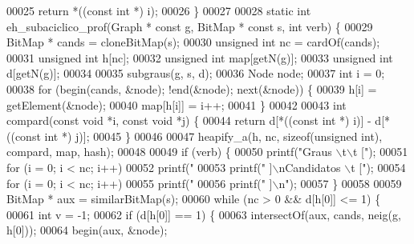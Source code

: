\begin{DoxyCode}
00025         \textcolor{keywordflow}{return} *((\textcolor{keyword}{const} \textcolor{keywordtype}{int} *) i);
00026 \}
00027 
00028 \textcolor{keyword}{static} \textcolor{keywordtype}{int} eh\_subaciclico\_prof(Graph * \textcolor{keyword}{const} g, BitMap * \textcolor{keyword}{const} s, \textcolor{keywordtype}{int} verb) \{
00029         BitMap * cands = cloneBitMap(s);
00030         \textcolor{keywordtype}{unsigned} \textcolor{keywordtype}{int} nc = cardOf(cands);
00031         \textcolor{keywordtype}{unsigned} \textcolor{keywordtype}{int} h[nc];
00032         \textcolor{keywordtype}{unsigned} \textcolor{keywordtype}{int} map[getN(g)];
00033         \textcolor{keywordtype}{unsigned} \textcolor{keywordtype}{int} d[getN(g)];
00034 
00035         subgraus(g, s, d);
00036         Node node;
00037         \textcolor{keywordtype}{int} i = 0;
00038         \textcolor{keywordflow}{for} (begin(cands, &node); !end(&node); next(&node)) \{
00039                 h[i] = getElement(&node);
00040                 map[h[i]] = i++;
00041         \}
00042 
00043         \textcolor{keywordtype}{int} compard(\textcolor{keyword}{const} \textcolor{keywordtype}{void} *i, \textcolor{keyword}{const} \textcolor{keywordtype}{void} *j) \{
00044                 \textcolor{keywordflow}{return} d[*((\textcolor{keyword}{const} \textcolor{keywordtype}{int} *) i)] - d[*((\textcolor{keyword}{const} \textcolor{keywordtype}{int} *) j)];
00045         \}
00046 
00047         heapify_a(h, nc, \textcolor{keyword}{sizeof}(\textcolor{keywordtype}{unsigned} \textcolor{keywordtype}{int}), compard, map, hash);
00048 
00049         \textcolor{keywordflow}{if} (verb) \{
00050                 printf(\textcolor{stringliteral}{"Graus \(\backslash\)t\(\backslash\)t ["});
00051                 \textcolor{keywordflow}{for} (i = 0; i < nc; i++)
00052                         printf(\textcolor{stringliteral}{" %
00053                 printf(\textcolor{stringliteral}{" ]\(\backslash\)nCandidatos \(\backslash\)t ["});
00054                 \textcolor{keywordflow}{for} (i = 0; i < nc; i++)
00055                         printf(\textcolor{stringliteral}{" %
00056                 printf(\textcolor{stringliteral}{" ]\(\backslash\)n"});
00057         \}
00058 
00059         BitMap * aux = similarBitMap(s);
00060         \textcolor{keywordflow}{while} (nc > 0 && d[h[0]] <= 1) \{
00061                 \textcolor{keywordtype}{int} v = -1;
00062                 \textcolor{keywordflow}{if} (d[h[0]] == 1) \{
00063                         intersectOf(aux, cands, neig(g, h[0]));
00064                         begin(aux, &node);
}}
\end{DoxyCode}
